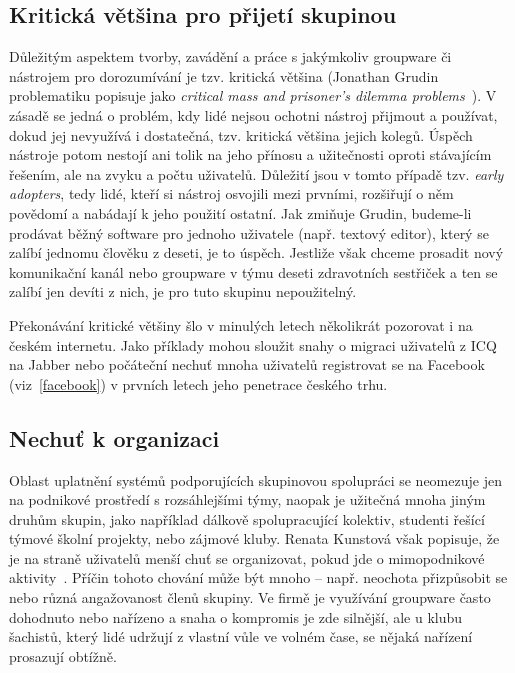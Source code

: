 \documentclass[12pt,oneside,final]{fithesis2}
\begin{document}
\subsection{Kritická většina pro přijetí skupinou}\label{criticalMass}
Důležitým aspektem tvorby, zavádění a práce s jakýmkoliv groupware či nástrojem pro dorozumívání je tzv. kritická většina (Jonathan Grudin problematiku popisuje jako \emph{critical mass and prisoner's dilemma problems}~\cite{grudin1994groupware}). V zásadě se jedná o problém, kdy lidé nejsou ochotni nástroj přijmout a používat, dokud jej nevyužívá i dostatečná, tzv. kritická většina jejich kolegů. Úspěch nástroje potom nestojí ani tolik na jeho přínosu a užitečnosti oproti stávajícím řešením, ale na zvyku a počtu uživatelů. Důležití jsou v tomto případě tzv. \emph{early adopters}, tedy lidé, kteří si nástroj osvojili mezi prvními, rozšiřují o něm povědomí a nabádají k jeho použití ostatní. Jak zmiňuje Grudin, budeme-li prodávat běžný software pro jednoho uživatele (např. textový editor), který se zalíbí jednomu člověku z deseti, je to úspěch. Jestliže však chceme prosadit nový komunikační kanál nebo groupware v týmu deseti zdravotních sestřiček a ten se zalíbí jen devíti z nich, je pro tuto skupinu nepoužitelný.

Překonávání kritické většiny šlo v minulých letech několikrát pozorovat i na českém internetu. Jako příklady mohou sloužit snahy o migraci uživatelů z ICQ na Jabber nebo počáteční nechuť mnoha uživatelů registrovat se na Facebook (viz~\ref{facebook}) v prvních letech jeho penetrace českého trhu.

\subsection{Nechuť k organizaci}\label{noOrganization}
Oblast uplatnění systémů podporujících skupinovou spolupráci se neomezuje jen na podnikové prostředí s rozsáhlejšími týmy, naopak je užitečná mnoha jiným druhům skupin, jako například dálkově spolupracující kolektiv, studenti řešící týmové školní projekty, nebo zájmové kluby. Renata Kunstová však popisuje, že je na straně uživatelů menší chuť se organizovat, pokud jde o mimopodnikové aktivity~\cite{kunstova1999skupinova}. Příčin tohoto chování může být mnoho -- např. neochota přizpůsobit se nebo různá angažovanost členů skupiny. Ve firmě je využívání groupware často dohodnuto nebo nařízeno a snaha o kompromis je zde silnější, ale u klubu šachistů, který lidé udržují z vlastní vůle ve volném čase, se nějaká nařízení prosazují obtížně.
\end{document}
